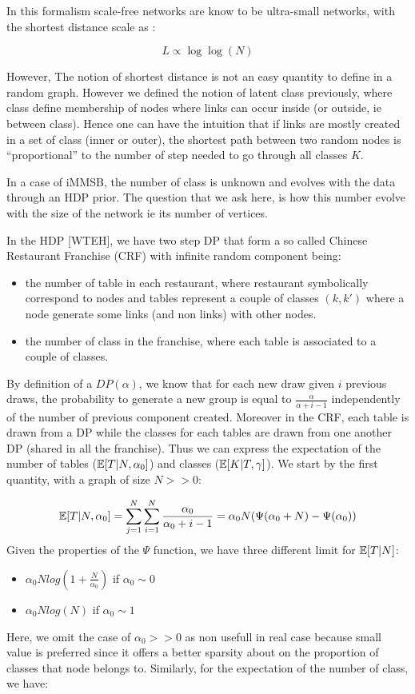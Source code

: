 \documentclass[a4paper, 12pt]{article}
\begin{document}
In this formalism scale-free networks are know to be ultra-small
networks, with the shortest distance scale as \cite{cohen2003scale}:

\begin{equation}
L \propto \log\log(N)
\end{equation}

However, The notion of shortest distance is not an easy quantity to define in a
random graph. However we defined the notion of latent class previously,
where class define membership of nodes where links can occur inside (or
outside, ie between class). Hence one can have the
intuition that if links are mostly created in a set of class (inner or
outer), the shortest path between two random nodes is
``proportional'' to the number of step needed  to go through all classes $K$.

In a case of iMMSB, the number of class is unknown and evolves with the data through an HDP prior. The question that we ask here, is how this number evolve with the size of the network ie its number of vertices.

In the HDP {[}WTEH{]}, we have two step DP that form a so called Chinese
Restaurant Franchise (CRF) with infinite random component being:
\begin{itemize}
\item the number of
table in each restaurant, where restaurant symbolically correspond to
nodes and tables represent a couple of classes $(k,k')$ where a node generate some links (and non links) with other nodes. 
\item the
number of class in the franchise, where each table is associated to a couple of classes.
\end{itemize}

By definition of a \(DP(\alpha)\), we know that for each new draw given
\(i\) previous draws, the probability to generate a new group is equal
to \(\frac{\alpha}{\alpha +i-1}\) independently of the number of previous
component created. Moreover in the CRF, each table is drawn from a DP while the classes for each tables are drawn from one another DP (shared in all the franchise). Thus we can express the expectation of the number of tables ($\mathbb{E}[T|N, \alpha_0]$) and classes ($\mathbb{E}[K|T, \gamma]$). We start by the first quantity, with a graph of size $N >> 0$:

\begin{align}
\mathbb{E}[T|N, \alpha_0] = \sum_{j=1}^N\sum_{i=1}^N \frac{\alpha_0}{\alpha_0 +i-1} = \alpha_0 N (\Psi(\alpha_0+N) - \Psi(\alpha_0))
\end{align}
Given the properties of the $\Psi$ function, we have three different limit for $\mathbb{E}[T|N]$:
\begin{itemize}
	\item $\alpha_0 N log(1+\frac{N}{\alpha_0})$ if  $\alpha_0 \sim 0$
	\item $\alpha_0 N log(N)$ if  $\alpha_0 \sim 1$
\end{itemize}
Here, we omit the case of $\alpha_0 >> 0$ as non usefull in real case because small value is preferred since it offers a better sparsity about on the proportion of classes that node belongs to. Similarly, for the expectation of the number of class, we have:
\end{document}
